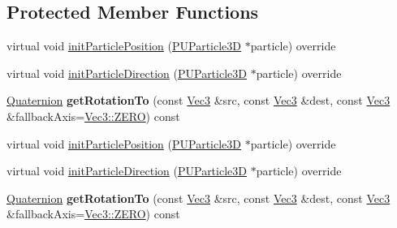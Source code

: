 \subsection*{Protected Member Functions}
\begin{DoxyCompactItemize}
\item 
virtual void \hyperlink{classPUCircleEmitter_ae5f34473b3fc262944ed96489a5ed5ce}{init\+Particle\+Position} (\hyperlink{structPUParticle3D}{P\+U\+Particle3D} $\ast$particle) override
\item 
virtual void \hyperlink{classPUCircleEmitter_aaf9f5cd827deabac2b6f9e5417483403}{init\+Particle\+Direction} (\hyperlink{structPUParticle3D}{P\+U\+Particle3D} $\ast$particle) override
\item 
\mbox{\label{classPUCircleEmitter_a3596a9774bde48545462868af7943e5f}} 
\hyperlink{classQuaternion}{Quaternion} {\bfseries get\+Rotation\+To} (const \hyperlink{classVec3}{Vec3} \&src, const \hyperlink{classVec3}{Vec3} \&dest, const \hyperlink{classVec3}{Vec3} \&fallback\+Axis=\hyperlink{classVec3_a26c0c52a5fba36ed0ef5e6d5026569f4}{Vec3\+::\+Z\+E\+RO}) const
\item 
virtual void \hyperlink{classPUCircleEmitter_a29bb94b8103ac04b51b65ca4780ce490}{init\+Particle\+Position} (\hyperlink{structPUParticle3D}{P\+U\+Particle3D} $\ast$particle) override
\item 
virtual void \hyperlink{classPUCircleEmitter_ae1e552dbbcd6df4a4e313a887a5d882c}{init\+Particle\+Direction} (\hyperlink{structPUParticle3D}{P\+U\+Particle3D} $\ast$particle) override
\item 
\mbox{\label{classPUCircleEmitter_a153b8400b4c47eb0f62dc7bcdb699dbd}} 
\hyperlink{classQuaternion}{Quaternion} {\bfseries get\+Rotation\+To} (const \hyperlink{classVec3}{Vec3} \&src, const \hyperlink{classVec3}{Vec3} \&dest, const \hyperlink{classVec3}{Vec3} \&fallback\+Axis=\hyperlink{classVec3_a26c0c52a5fba36ed0ef5e6d5026569f4}{Vec3\+::\+Z\+E\+RO}) const
\end{DoxyCompactItemize}
